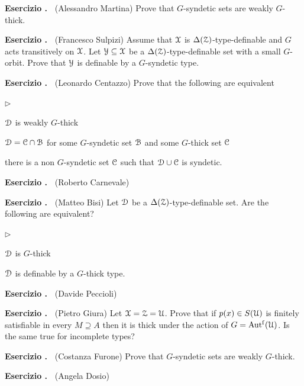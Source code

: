 \documentclass[10pt]{article}
\def\B{\EuScript B}
\def\D{\EuScript D}
\def\C{\EuScript C}
\def\U{\EuScript U}
\def\X{\EuScript X}
\def\Y{\EuScript Y}
\def\Z{\EuScript Z}
\def\Autf{\textrm{Aut$^{\rm f}$}}
\newcommand{\labella}[1]{{\sf\footnotesize #1}\hfill}
\renewenvironment{itemize}
  {\begin{list}{$\triangleright$}{%
   \setlength{\parskip}{0mm}
   \setlength{\topsep}{0mm}
   \setlength{\rightmargin}{0mm}
   \setlength{\listparindent}{0mm}
   \setlength{\itemindent}{0mm}
   \setlength{\labelwidth}{3ex}
   \setlength{\itemsep}{0mm}
   \setlength{\parsep}{0mm}
   \setlength{\partopsep}{0mm}
   \setlength{\labelsep}{1ex}
   \setlength{\leftmargin}{\labelwidth+\labelsep}
   \let\makelabel\labella}}{%
   \vspace*{-.3\baselineskip}
  \end{list}}
\newcounter{ex}
\newenvironment{exercise}{\bigskip\addtocounter{ex}{1}\textbf{Esercizio \theex.\ }}{}
\begin{document}
\begin{exercise}
  (Alessandro Martina)
  Prove that $G$-syndetic sets are weakly $G$-thick.
\end{exercise}

\begin{exercise} 
  (Francesco Sulpizi)
  Assume that $\X$ is $\Delta(\Z)$-type-definable and $G$ acts transitively on $\X$.
  Let $\Y\subseteq\X$ be a $\Delta(\Z)$-type-definable set with a small $G$-orbit.
  Prove that $\Y$ is definable by a $G$-syndetic type.
\end{exercise}

\begin{exercise}
  (Leonardo Centazzo)
  Prove that the following are equivalent
  \begin{itemize}
    \item[1.] $\D$ is weakly $G$-thick
    \item[2.] $\D=\C\cap\B$ for some $G$-syndetic set $\B$ and some $G$-thick set $\C$
    \item [3.] there is a non $G$-syndetic set $\C$ such that $\D\cup\C$ is syndetic.
  \end{itemize}
\end{exercise}

\begin{exercise}
  (Roberto Carnevale)
\end{exercise}

\begin{exercise}
  (Matteo Bisi)
  Let $\D$ be a $\Delta(\Z)$-type-definable set.
  Are the following are equivalent?
  \begin{itemize}
    \item[1.] $\D$ is $G$-thick
    \item[2.] $\D$ is definable by a $G$-thick type.
  \end{itemize}
\end{exercise}

\begin{exercise}
  (Davide Peccioli)
\end{exercise}

\begin{exercise}
  (Pietro Giura)
  Let $\X=\Z=\U$.
  Prove that if $p(x)\in S(\U)$ is finitely satisfiable in every $M\supseteq A$ then it is thick under the action of $G=\Autf(\U)$.
  Is the same true for incomplete types?
\end{exercise}

\begin{exercise} 
  (Costanza Furone)  
  Prove that $G$-syndetic sets are weakly $G$-thick.
\end{exercise}

\begin{exercise}
  (Angela Dosio)
\end{exercise}
  
\end{document}

